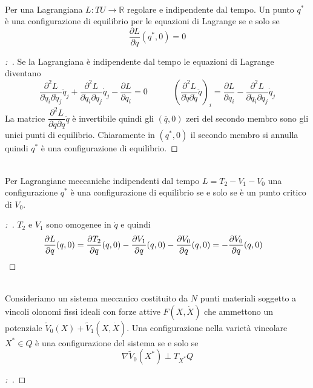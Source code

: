 \documentclass[11pt,a4paper,twoside]{book}
\newenvironment{proposizione}[1][\empty]{\begin{Proposizione}{
\ifx\empty#1\relax\else\mdseries\itshape#1\\\fi
}{}}{\end{Proposizione}}
\newenvironment{corollario}[1][\empty]{\begin{Corollario}{
\ifx\empty#1\relax\else\mdseries\itshape#1\\\fi
}{}}{\end{Corollario}}
\newenvironment{dimo}[1][\proofname]{
	\begin{tcolorbox}[
	breakable, 
	enhanced, 
	interior hidden, 
	frame hidden, 
	borderline west = {1pt}{0pt}{gray}, 
	top=0pt, bottom=0pt, left=0pt]
\begin{proof}[#1:~]
}
{
\end{proof}
\end{tcolorbox}
}
\theoremstyle{esss}
\theoremstyle{dotless}
\numberwithin{equation}{section} %
\begin{document}
\begin{proposizione}
Per una Lagrangiana $L:TU\rightarrow\mathbb{R}$ regolare e indipendente dal tempo. Un punto $q^*$ è una configurazione di equilibrio per le equazioni di Lagrange se e solo se 
\[
\dfrac{\partial L}{\partial q}(q^*,0)=0
\]
\end{proposizione}

\begin{dimo}Se la Lagrangiana è indipendente dal tempo le equazioni di Lagrange diventano
\[
\dfrac{\partial^2 L}{\partial \dot{q}_i\partial \dot{q}_j}\ddot{q}_j + \dfrac{\partial^2 L}{\partial\dot{q}_i\partial q_j}\dot{q}_j - \dfrac{\partial L}{\partial q_i}=0 \qquad\quad \left( \dfrac{\partial^2 L}{\partial \dot{q}\partial \dot{q}}\ddot{q} \right)_i =   \dfrac{\partial L}{\partial q_i} - \dfrac{\partial^2 L}{\partial\dot{q}_i\partial q_j}\dot{q}_j 
\]
La matrice $\dfrac{\partial^2 L}{\partial \dot{q}\partial \dot{q}}\ddot{q}$ è invertibile quindi gli $(\overline{q},0)$ zeri del secondo membro sono gli unici punti di equilibrio.
Chiaramente in $(q^*,0)$ il secondo membro si annulla quindi $q^*$ è una configurazione di equilibrio.
\end{dimo}

\begin{corollario}\label{corEquilibrioLagrangeCriticoV0}
Per Lagrangiane meccaniche indipendenti dal tempo $L=T_2-V_1-V_0$ una configurazione $q^*$ è una configurazione di equilibrio se e solo se è un punto critico di $V_0$.
\end{corollario}
\begin{dimo}
$T_2$ e $V_1$ sono omogenee in $\dot{q}$ e quindi 
\[
\dfrac{\partial L}{\partial q} (q,0) = \dfrac{\partial T_2}{\partial q}(q,0)-\dfrac{\partial V_1}{\partial q}(q,0)-\dfrac{\partial V_0}{\partial q}(q,0)=-\dfrac{\partial V_0}{\partial q}(q,0) \quad  \qedhere
\]
\end{dimo}

\begin{corollario}\label{corEquilibriLagrangianaConfig}
Consideriamo un sistema meccanico costituito da $N$ punti materiali soggetto a vincoli olonomi fissi ideali con forze attive $F(X,\dot{X})$ che ammettono un potenziale $\tilde{V}_0(X)+\tilde{V}_1(X,\dot{X})$. Una configurazione nella varietà vincolare $X^*\in Q$ è una configurazione del sistema se e solo se
\[
\nabla \tilde{V}_0 (X^*) \perp T_{X^*}Q
\]
\end{corollario}

\begin{dimo}

\end{dimo}
\end{document}
